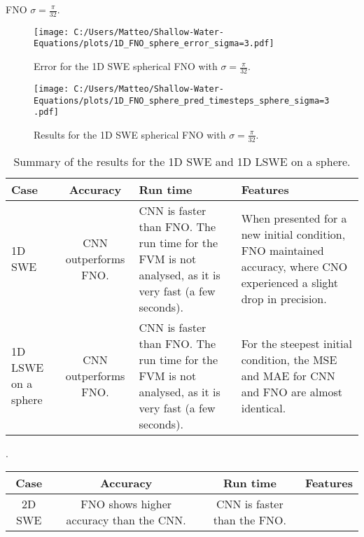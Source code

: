 FNO $\sigma = \frac{\pi}{32}$.
\begin{figure}[H]
    \centering
    \texttt{[image: C:/Users/Matteo/Shallow-Water-Equations/plots/1D\_FNO\_sphere\_error\_sigma=3.pdf]}
    \caption{Error for the 1D SWE spherical FNO with $\sigma = \frac{\pi}{32}$.}
\end{figure}

\begin{figure}[H]
    \centering
    \texttt{[image: C:/Users/Matteo/Shallow-Water-Equations/plots/1D\_FNO\_sphere\_pred\_timesteps\_sphere\_sigma=3.pdf]}
    \caption{Results for the 1D SWE spherical FNO with $\sigma = \frac{\pi}{32}$.}
\end{figure}







\begin{table}[H]
    \centering
    \begin{tabular}{|p{2cm}|c|p{3.3cm}|p{6.2cm}|}
        \hline
        \textbf{Case}  & \textbf{Accuracy} & \textbf{Run time} & \textbf{Features}  \\ \hline
        1D SWE & CNN outperforms FNO. & CNN is faster than FNO. The run time for the FVM is not analysed, as it is very fast (a few seconds). & When presented for a new initial condition, FNO maintained accuracy, where CNO experienced a slight drop in precision. \\ \hline
        1D LSWE on a sphere & CNN outperforms FNO. & CNN is faster than FNO. The run time for the FVM is not analysed, as it is very fast (a few seconds). & For the steepest initial condition, the MSE and MAE for CNN and FNO are almost identical. \\ \hline
    \end{tabular}
    \caption{Summary of the results for the 1D SWE and 1D LSWE on a sphere.} \label{tab:summary_1D}
\end{table}

\begin{table}[H]. 
    \centering
    \begin{tabular}{|c|c|c|p{6.5cm}|}
        \hline
        \textbf{Case}  & \textbf{Accuracy} & \textbf{Run time} & \textbf{Features}  \\ \hline
        2D SWE & FNO shows higher accuracy than the CNN. & CNN is faster than the FNO. 
    \end{tabular}
\end{table}






